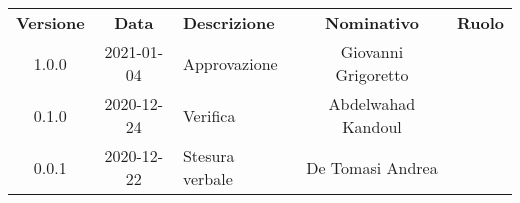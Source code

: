 {
    \renewcommand{\arraystretch}{1.5}
    \centering
    \begin{longtable}{ c c  C{4cm}  c  c }
        \rowcolor{\primaryColor}
        \textcolor{\secondaryColor}{
        \textbf{Versione}}     & \textcolor{\secondaryColor}{\textbf{Data}}       & \textcolor{\secondaryColor}
        {\textbf{Descrizione}} & \textcolor{\secondaryColor}{\textbf{Nominativo}} & \textcolor{\secondaryColor}{\textbf{Ruolo}}                          \\


        1.0.0                  & 2021-01-04                                       & Approvazione                                & Giovanni Grigoretto & \responsabile{} \\
        0.1.0                  & 2020-12-24                                       & Verifica                                    & Abdelwahad Kandoul & \verificatore{} \\
        0.0.1                  & 2020-12-22                                       & Stesura verbale                            & De Tomasi Andrea & \redattore{}    \\
    \end{longtable}
}